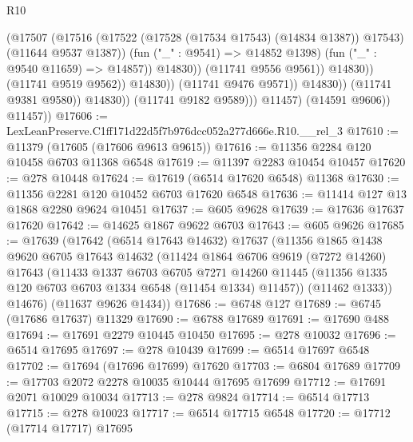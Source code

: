 \begin{lexlean}{R10}
\begin{coremodule}
                                            (@17507
                                              (@17516
                                                (@17522
                                                  (@17528 (@17534 @17543) (@14834 @1387))
                                                  @17543)
                                                (@11644 @9537 @1387))
                                              (fun ("_" : @9541) => @14852 @1398)
                                              (fun ("_" : @9540 @11659) => @14857))
                                            @14830))
                                        (@11741 @9556 @9561))
                                      @14830))
                                  (@11741 @9519 @9562))
                                @14830))
                            (@11741 @9476 @9571))
                          @14830))
                      (@11741 @9381 @9580))
                    @14830))
                (@11741 @9182 @9589)))
            @11457)
          (@14591 @9606))
        @11457))
@17606 := LexLeanPreserve.C1ff171d22d5f7b976dcc052a277d666e.R10.__rel_3
@17610 := @11379 (@17605 (@17606 @9613 @9615))
@17616 := @11356 @2284 @120 @10458 @6703 @11368 @6548
@17619 := @11397 @2283 @10454 @10457
@17620 := @278 @10448
@17624 := @17619 (@6514 @17620 @6548) @11368
@17630 := @11356 @2281 @120 @10452 @6703 @17620 @6548
@17636 := @11414 @127 @13 @1868 @2280 @9624 @10451
@17637 := @605 @9628
@17639 := @17636 @17637 @17620
@17642 := @14625 @1867 @9622 @6703
@17643 := @605 @9626
@17685 := @17639
    (@17642
      (@6514 @17643 @14632)
      @17637
      (@11356
        @1865
        @1438
        @9620
        @6705
        @17643
        @14632
        (@11424
          @1864
          @6706
          @9619
          (@7272 @14260)
          @17643
          (@11433
            @1337
            @6703
            @6705
            @7271
            @14260
            @11445
            (@11356 @1335 @120 @6703 @6703 @1334 @6548 (@11454 @1334) @11457))
          (@11462 @1333))
        @14676)
      (@11637 @9626 @1434))
@17686 := @6748 @127
@17689 := @6745 (@17686 @17637) @11329
@17690 := @6788 @17689
@17691 := @17690 @488
@17694 := @17691 @2279 @10445 @10450
@17695 := @278 @10032
@17696 := @6514 @17695
@17697 := @278 @10439
@17699 := @6514 @17697 @6548
@17702 := @17694 (@17696 @17699) @17620
@17703 := @6804 @17689
@17709 := @17703 @2072 @2278 @10035 @10444 @17695 @17699
@17712 := @17691 @2071 @10029 @10034
@17713 := @278 @9824
@17714 := @6514 @17713
@17715 := @278 @10023
@17717 := @6514 @17715 @6548
@17720 := @17712 (@17714 @17717) @17695

\end{coremodule}
\end{lexlean}

